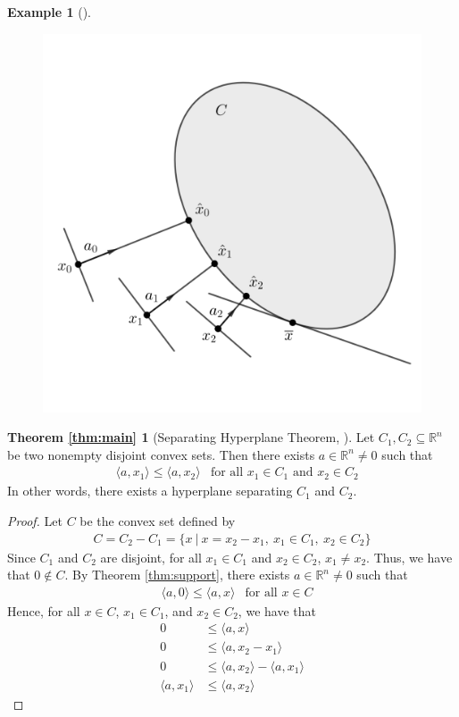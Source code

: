 \documentclass[11pt,reqno]{amsart}
\newcommand{\R}{\mathbb{R}}
\theoremstyle{plain}
\theoremstyle{definition}
\newtheorem{example}[theorem]{Example}
\newtheorem*{maintheorema}{Theorem \ref{thm:main}}
\begin{document}
{\begin{example}[{\cite[1.5.3]{bertsekas2009convex}}]
    \begin{figure}[h]
    \centering
    \begin{minipage}{.5\textwidth}
      \centering
      \includegraphics[height = 1.7 in]{thoeremB.png}
      \label{fig:test1}
    \end{minipage}%
    \end{figure}
\end{example}
\smallskip
\begin{maintheorema}[{Separating Hyperplane Theorem, \cite[1.5.2]{bertsekas2009convex}}]
   Let $C_1, C_2 \subseteq\R^n$ be two nonempty disjoint convex sets. Then there exists $a\in\R^n\neq 0$ such that 
   \begin{align*}
    &\langle a,x_1\rangle \leq \langle a,x_2\rangle &\text{for all $x_1 \in C_1$ and $x_2 \in C_2$}
   \end{align*}
   In other words, there exists a hyperplane separating $C_1$ and $C_2$.
   \begin{proof}
       Let $C$ be the convex set defined by
       \begin{align*}
           C = C_2 - C_1 = \{x\ |\ x= x_2 - x_1,\ x_1\in C_1,\ x_2\in C_2\}
       \end{align*}
       Since $C_1$ and $C_2$ are disjoint, for all $x_1\in C_1$ and $x_2\in C_2$, $x_1\neq x_2$. Thus, we have that $0\notin C$. By Theorem \ref{thm:support}, there exists $a\in\R^n\neq 0$ such that
       \begin{align*}
           &\langle a,0\rangle \leq \langle a,x\rangle &\text{for all $x\in C$}
       \end{align*}
       Hence, for all $x\in C$, $x_1\in C_1$, and $x_2\in C_2$, we have that
       \begin{align*}
           0 &\leq \langle a,x\rangle\\
           0 &\leq \langle a,x_2-x_1\rangle\\
           0 &\leq \langle a,x_2\rangle - \langle a,x_1\rangle\\
           \langle a,x_1\rangle &\leq \langle a,x_2\rangle

\end{align*}
\end{proof}
\end{maintheorema}}
\end{document}
